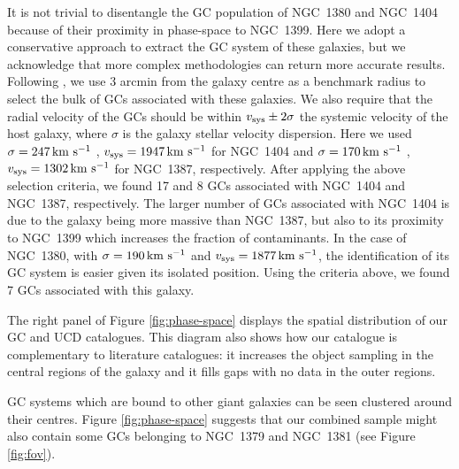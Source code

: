 \documentclass[useAMS,usenatbib]{mn2e}
\newcommand{\kms}{\mbox{\,km~s$^{-1}$}}
\begin{document}
It is not trivial to disentangle the GC population of NGC~1380 and NGC~1404 because of their proximity in phase-space to NGC~1399. 
Here we adopt a conservative approach to extract the GC system of these galaxies, but we acknowledge that more complex methodologies can return more accurate results. Following \citet{Schuberth}, we use 3 arcmin from the galaxy centre as a benchmark radius to select the bulk of GCs associated with these galaxies. We also require that the radial velocity of the GCs should be within $v_{\rm sys} \pm 2\sigma$  the systemic velocity of the host galaxy, where $\sigma$ is the galaxy stellar velocity dispersion. Here we used $\sigma = 247 \kms$  \citep{Vanderbeke11}, $v_{\rm sys} = 1947 \kms$ for NGC~1404 and $\sigma = 170 \kms$ \citep{Wegner03}, $v_{\rm sys} = 1302\kms $ for NGC~1387, respectively. After applying the above selection criteria, we found 17 and 8 GCs associated with NGC~1404 and NGC~1387, respectively. The larger number of GCs associated with NGC~1404 is due to the galaxy being more massive than NGC~1387, but also to its proximity to NGC~1399 which increases the fraction of contaminants.
In the case of NGC~1380, with $\sigma = 190 \kms$  \citep{Vanderbeke11} and $v_{\rm sys} = 1877 \kms$, the identification of its GC system is easier given its isolated position. Using the criteria above, we found 7 GCs associated with this galaxy. 

The right panel of Figure \ref{fig:phase-space} displays the spatial distribution of our GC and UCD catalogues. This diagram also shows how our catalogue is complementary to literature catalogues: it increases the object sampling in the central regions of the galaxy and it fills gaps with no data in the outer regions. 

GC systems which are bound to other giant galaxies can be seen clustered around their centres. Figure \ref{fig:phase-space} suggests that our combined sample might also contain some GCs belonging to NGC~1379 and NGC~1381 (see Figure \ref{fig:fov}). 

\end{document}
